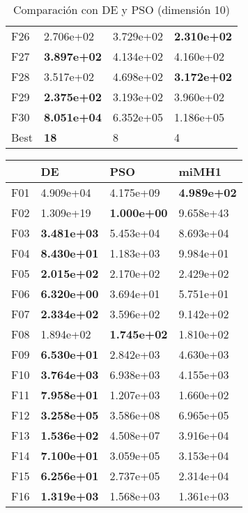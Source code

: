 \documentclass[10pt,a4paper]{article}
\begin{document}
\begin{table}[h]
\begin{tabular}{|l|l|l|l|}
		F26  &  2.706e+02 &  3.729e+02 &  \textbf{2.310e+02} \\
		F27  &  \textbf{3.897e+02} &  4.134e+02 &  4.160e+02 \\
		F28  &  3.517e+02 &  4.698e+02 &  \textbf{3.172e+02} \\
		F29  &  \textbf{2.375e+02} &  3.193e+02 &  3.960e+02 \\
		F30  &  \textbf{8.051e+04} &  6.352e+05 &  1.186e+05 \\ \hline
		Best &         \textbf{18} &          8 &          4 \\ \hline
	\end{tabular}
	\caption{Comparación con DE y PSO (dimensión 10)}
	\label{table:mimh1_dim10}
\end{table}


\begin{table}[]
	\centering
	\begin{tabular}{|l|l|l|l|}
		\hline
		{} &         DE &        PSO &      miMH1 \\ \hline
		F01  &  4.909e+04 &  4.175e+09 &  \textbf{4.989e+02} \\
		F02  &  1.309e+19 &  \textbf{1.000e+00} &  9.658e+43 \\
		F03  &  \textbf{3.481e+03} &  5.453e+04 &  8.693e+04 \\
		F04  &  \textbf{8.430e+01} &  1.183e+03 &  9.984e+01 \\
		F05  &  \textbf{2.015e+02} &  2.170e+02 &  2.429e+02 \\
		F06  &  \textbf{6.320e+00} &  3.694e+01 &  5.751e+01 \\
		F07  &  \textbf{2.334e+02} &  3.596e+02 &  9.142e+02 \\
		F08  &  1.894e+02 &  \textbf{1.745e+02} &  1.810e+02 \\
		F09  &  \textbf{6.530e+01} &  2.842e+03 &  4.630e+03 \\
		F10  &  \textbf{3.764e+03} &  6.938e+03 &  4.155e+03 \\
		F11  &  \textbf{7.958e+01} &  1.207e+03 &  1.660e+02 \\
		F12  &  \textbf{3.258e+05} &  3.586e+08 &  6.965e+05 \\
		F13  &  \textbf{1.536e+02} &  4.508e+07 &  3.916e+04 \\
		F14  &  \textbf{7.100e+01} &  3.059e+05 &  3.153e+04 \\
		F15  &  \textbf{6.256e+01} &  2.737e+05 &  2.314e+04 \\
		F16  &  \textbf{1.319e+03} &  1.568e+03 &  1.361e+03 \\

\end{tabular}
\end{table}
\end{document}
